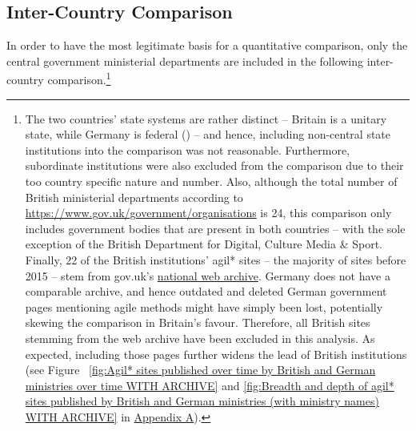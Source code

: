 \subsection{Inter-Country Comparison}\label{Inter-Country Comparison} 
\begin{wrapfigure}[10]{r}{0.5\textwidth}
	\centering
	\vspace{-14pt}
	 \texttt{[image: \{"Code/3\_Data\_Analysis/visualisations/british\_vs\_German\_federal\_ministries\_over\_time\_without\_archive"]}.pdf}
	 \setlength{\belowcaptionskip}{-30pt}
	 \caption[Agil* sites published by British and German central government ministerial departments over time]{Agil* sites published by British and German central government ministerial departments over time}
	 \label{fig:Agil* sites published over time by British and German ministries over time}
\end{wrapfigure}
In order to have the most legitimate basis for a quantitative comparison, only the central government ministerial departments are included in the following inter-country comparison.\footnote{The two countries' state systems are rather distinct – Britain is a unitary state, while Germany is federal (\cite{Elazar1997}) – and hence, including non-central state institutions into the comparison was not reasonable. Furthermore, subordinate institutions were also excluded from the comparison due to their too country specific nature and number. Also, although the total number of British ministerial departments according to \url{https://www.gov.uk/government/organisations} is 24, this comparison only includes government bodies that are present in both countries – with the sole exception of the British Department for Digital, Culture Media \& Sport. Finally, 22 of the British institutions' agil* sites – the majority of sites before 2015 – stem from gov.uk's \href{https://webarchive.nationalarchives.gov.uk/search/}{national web archive}. Germany does not have a comparable archive, and hence outdated and deleted German government pages mentioning agile methods might have simply been lost, potentially skewing the comparison in Britain's favour. Therefore, all British sites stemming from the web archive have been excluded in this analysis. As expected, including those pages further widens the lead of British institutions (see Figure
~\ref{fig:Agil* sites published over time by British and German ministries over time WITH ARCHIVE} and \ref{fig:Breadth and depth of agil* sites published by British and German ministries (with ministry names) WITH ARCHIVE} in \hyperref[Appendix A]{Appendix A}).} 

